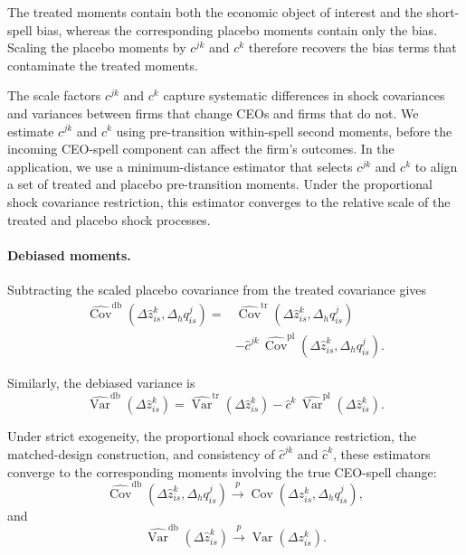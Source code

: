 \documentclass[sigconf,nonacm]{acmart}
\begin{document}
The treated moments contain both the economic object of interest and
the short-spell bias, whereas the corresponding placebo moments
contain only the bias. Scaling the placebo moments by $c^{jk}$ and $c^{k}$ therefore
recovers the bias terms that contaminate the treated moments.

The scale factors $c^{jk}$ and $c^k$ capture systematic differences in
shock covariances and variances between firms that change CEOs and firms that do not. We
estimate $c^{jk}$ and $c^{k}$ using pre-transition within-spell second moments, before the incoming
CEO-spell component can affect the firm's outcomes. In the application,
we use a minimum-distance estimator that selects $c^{jk}$ and $c^{k}$ to align a set of
treated and placebo pre-transition moments. Under the proportional
shock covariance restriction, this estimator converges to the relative
scale of the treated and placebo shock processes.

\paragraph{Debiased moments.}
Subtracting the scaled placebo covariance from the treated covariance
gives
\begin{align}
\widehat{\operatorname{Cov}}^{\mathrm{db}}\!\left(
\Delta\widehat z_{is}^{k},
\Delta_h q_{is}^{j}
\right)
={}&
\widehat{\operatorname{Cov}}^{\mathrm{tr}}\!\left(
\Delta\widehat z_{is}^{k},
\Delta_h q_{is}^{j}
\right)
\nonumber\\
&-
\widehat c^{jk}\,
\widehat{\operatorname{Cov}}^{\mathrm{pl}}\!\left(
\Delta\widehat z_{is}^{k},
\Delta_h q_{is}^{j}
\right).
\label{eq:debiased_covariance}
\end{align}

Similarly, the debiased variance is
\begin{equation}
\widehat{\operatorname{Var}}^{\mathrm{db}}\!\left(
\Delta\widehat z_{is}^{k}
\right)
=
\widehat{\operatorname{Var}}^{\mathrm{tr}}\!\left(
\Delta\widehat z_{is}^{k}
\right)
-
\widehat c^k\,
\widehat{\operatorname{Var}}^{\mathrm{pl}}\!\left(
\Delta\widehat z_{is}^{k}
\right).
\label{eq:debiased_variance}
\end{equation}

Under strict exogeneity, the proportional shock covariance restriction,
the matched-design construction, and consistency of $\widehat c^{jk}$ and $\widehat c^{k}$,
these estimators converge to the corresponding moments involving the
true CEO-spell change:
\begin{equation}
\widehat{\operatorname{Cov}}^{\mathrm{db}}\!\left(
\Delta\widehat z_{is}^{k},
\Delta_h q_{is}^{j}
\right)
\overset{p}{\longrightarrow}
\operatorname{Cov}\!\left(
\Delta z_{is}^{k},
\Delta_h q_{is}^{j}
\right),
\label{eq:debiased_covariance_plim}
\end{equation}
and
\begin{equation}
\widehat{\operatorname{Var}}^{\mathrm{db}}\!\left(
\Delta\widehat z_{is}^{k}
\right)
\overset{p}{\longrightarrow}
\operatorname{Var}\!\left(
\Delta z_{is}^{k}
\right).
\label{eq:debiased_variance_plim}
\end{equation}
\end{document}
